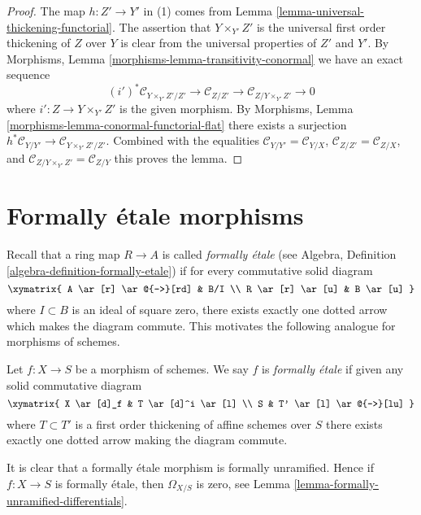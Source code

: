 \begin{proof}
The map $h : Z' \to Y'$ in (1) comes from
Lemma \ref{lemma-universal-thickening-functorial}.
The assertion that $Y \times_{Y'} Z'$ is the universal first order
thickening of $Z$ over $Y$ is clear from the universal properties
of $Z'$ and $Y'$. By
Morphisms, Lemma \ref{morphisms-lemma-transitivity-conormal}
we have an exact sequence
$$
(i')^*\mathcal{C}_{Y \times_{Y'} Z'/Z'} \to
\mathcal{C}_{Z/Z'} \to
\mathcal{C}_{Z/Y \times_{Y'} Z'} \to 0
$$
where $i' : Z \to Y \times_{Y'} Z'$ is the given morphism. By
Morphisms, Lemma \ref{morphisms-lemma-conormal-functorial-flat}
there exists a surjection
$h^*\mathcal{C}_{Y/Y'} \to \mathcal{C}_{Y \times_{Y'} Z'/Z'}$.
Combined with the equalities
$\mathcal{C}_{Y/Y'} = \mathcal{C}_{Y/X}$,
$\mathcal{C}_{Z/Z'} = \mathcal{C}_{Z/X}$, and
$\mathcal{C}_{Z/Y \times_{Y'} Z'} = \mathcal{C}_{Z/Y}$
this proves the lemma.
\end{proof}











\section{Formally \'etale morphisms}
\label{section-formally-etale}

\noindent
Recall that a ring map $R \to A$ is called {\it formally \'etale}
(see Algebra, Definition \ref{algebra-definition-formally-etale})
if for every commutative solid diagram
$$
\xymatrix{
A \ar[r] \ar@{-->}[rd] & B/I \\
R \ar[r] \ar[u] & B \ar[u]
}
$$
where $I \subset B$ is an ideal of square zero, there exists
exactly one dotted arrow which makes the diagram commute. This motivates
the following analogue for morphisms of schemes.

\begin{definition}
\label{definition-formally-etale}
Let $f : X \to S$ be a morphism of schemes.
We say $f$ is {\it formally \'etale} if given any solid commutative diagram
$$
\xymatrix{
X \ar[d]_f & T \ar[d]^i \ar[l] \\
S & T' \ar[l] \ar@{-->}[lu]
}
$$
where $T \subset T'$ is a first order thickening of affine schemes over $S$
there exists exactly one dotted arrow making the diagram commute.
\end{definition}

\noindent
It is clear that a formally \'etale morphism is formally unramified.
Hence if $f : X \to S$ is formally \'etale, then $\Omega_{X/S}$ is zero, see
Lemma \ref{lemma-formally-unramified-differentials}.

